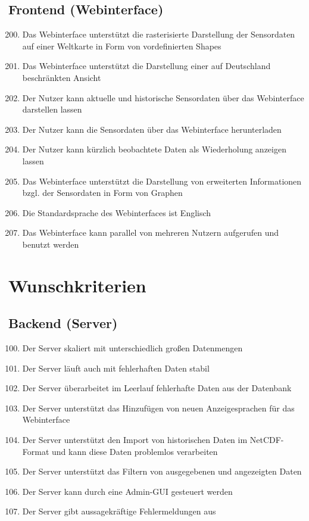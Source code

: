 \subsection{Frontend (Webinterface)}
\begin{enumerate}[label=\textbf{MK\arabic{enumi}0}]
	\setcounter{enumi}{199}
	\item Das Webinterface unterstützt die rasterisierte Darstellung der Sensordaten auf einer Weltkarte in Form von vordefinierten Shapes
	\item Das Webinterface unterstützt die Darstellung einer auf Deutschland beschränkten Ansicht
	\item Der Nutzer kann aktuelle und historische Sensordaten über das Webinterface darstellen lassen
	\item Der Nutzer kann die Sensordaten über das Webinterface herunterladen
	\item Der Nutzer kann kürzlich beobachtete Daten als Wiederholung anzeigen lassen
	\item Das Webinterface unterstützt die Darstellung von erweiterten Informationen bzgl. der Sensordaten in Form von Graphen
	\item Die Standardsprache des Webinterfaces ist Englisch
	\item Das Webinterface kann parallel von mehreren Nutzern aufgerufen und benutzt werden
\end{enumerate}

\section{Wunschkriterien}
\subsection{Backend (Server)}
\begin{enumerate}[label=\textbf{WK\arabic{enumi}0}]
	\setcounter{enumi}{99}
	\item Der Server skaliert mit unterschiedlich großen Datenmengen
	\item Der Server läuft auch mit fehlerhaften Daten stabil
	\item Der Server überarbeitet im Leerlauf fehlerhafte Daten aus der Datenbank
	\item Der Server unterstützt das Hinzufügen von neuen Anzeigesprachen für das Webinterface
	\item Der Server unterstützt den Import von historischen Daten im NetCDF-Format und kann diese Daten problemlos verarbeiten
	\item Der Server unterstützt das Filtern von ausgegebenen und angezeigten Daten
	\item Der Server kann durch eine Admin-GUI gesteuert werden
	\item Der Server gibt aussagekräftige Fehlermeldungen aus
\end{enumerate}
